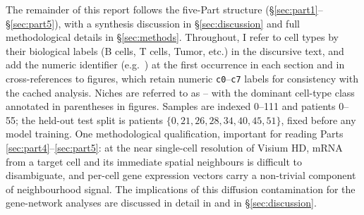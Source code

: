 The remainder of this report follows the five-Part structure (\S\ref{sec:part1}--\S\ref{sec:part5}), with a synthesis discussion in \S\ref{sec:discussion} and full methodological details in \S\ref{sec:methods}. Throughout, I refer to cell types by their biological labels (B cells, T cells, Tumor, etc.) in the discursive text, and add the numeric identifier (e.g.\ ) at the first occurrence in each section and in cross-references to figures, which retain numeric \texttt{c0}--\texttt{c7} labels for consistency with the cached analysis. Niches are referred to as -- with the dominant cell-type class annotated in parentheses in figures. Samples are indexed 0--111 and patients 0--55; the held-out test split is patients $\{0, 21, 26, 28, 34, 40, 45, 51\}$, fixed before any model training. One methodological qualification, important for reading Parts \ref{sec:part4}--\ref{sec:part5}: at the near single-cell resolution of Visium HD, mRNA from a target cell and its immediate spatial neighbours is difficult to disambiguate, and per-cell gene expression vectors carry a non-trivial component of neighbourhood signal. The implications of this diffusion contamination for the gene-network analyses are discussed in detail in  and in \S\ref{sec:discussion}.